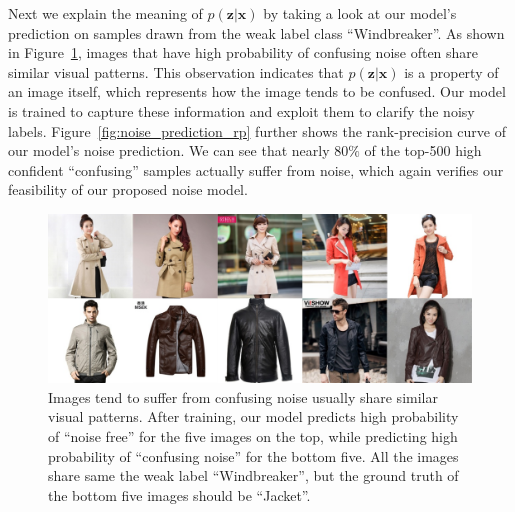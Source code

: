 \documentclass[10pt,twocolumn,letterpaper]{article}
\def\vec{\mathbf}
\begin{document}
Next we explain the meaning of $p(\vec{z}|\vec{x})$ by taking a look at our model's prediction on samples drawn from the weak label class ``Windbreaker''. As shown in Figure~\ref{fig:noise_cluster}, images that have high probability of confusing noise often share similar visual patterns. This observation indicates that $p(\vec{z}|\vec{x})$ is a property of an image itself, which represents how the image tends to be confused. Our model is trained to capture these information and exploit them to clarify the noisy labels. Figure~\ref{fig:noise_prediction_rp} further shows the rank-precision curve of our model's noise prediction. We can see that nearly $80\%$ of the top-500 high confident ``confusing'' samples actually suffer from noise, which again verifies our feasibility of our proposed noise model.

\begin{figure}[t]
\begin{center}
\includegraphics[width=1.0\linewidth]{figure/noise_cluster.pdf}
\end{center}
\caption{Images tend to suffer from confusing noise usually share similar visual patterns. After training, our model predicts high probability of ``noise free'' for the five images on the top, while predicting high probability of ``confusing noise'' for the bottom five. All the images share same the weak label ``Windbreaker'', but the ground truth of the bottom five images should be ``Jacket''.}
\label{fig:noise_cluster}
\end{figure}
\end{document}
